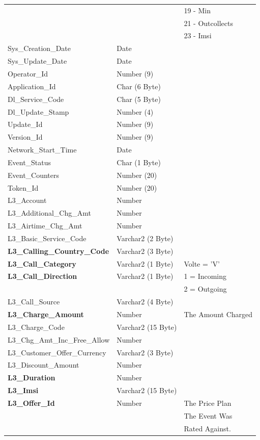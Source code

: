 \documentclass[12pt,twoside]{article}
\begin{document}
\begin{longtable}{l|l|l}
&  & 19 - Min\\
&  & 21 - Outcollects\\
&  & 23 - Imsi\\
Sys\_Creation\_Date & Date & \\
Sys\_Update\_Date & Date & \\
Operator\_Id & Number (9) & \\
Application\_Id & Char (6 Byte) & \\
Dl\_Service\_Code & Char (5 Byte) & \\
Dl\_Update\_Stamp & Number (4) & \\
Update\_Id & Number (9) & \\
Version\_Id & Number (9) & \\
Network\_Start\_Time & Date & \\
Event\_Status & Char (1 Byte) & \\
Event\_Counters & Number (20) & \\
Token\_Id & Number (20) & \\
L3\_Account & Number & \\
L3\_Additional\_Chg\_Amt & Number & \\
L3\_Airtime\_Chg\_Amt & Number & \\
L3\_Basic\_Service\_Code & Varchar2 (2 Byte) & \\
\textbf{L3\_Calling\_Country\_Code} & Varchar2 (3 Byte) & \\
\textbf{L3\_Call\_Category} & Varchar2 (1 Byte) & Volte = 'V'\\
\textbf{L3\_Call\_Direction} & Varchar2 (1 Byte) & 1 = Incoming\\
&  & 2 = Outgoing\\
L3\_Call\_Source & Varchar2 (4 Byte) & \\
\textbf{L3\_Charge\_Amount} & Number & The Amount Charged\\
L3\_Charge\_Code & Varchar2 (15 Byte) & \\
L3\_Chg\_Amt\_Inc\_Free\_Allow & Number & \\
L3\_Customer\_Offer\_Currency & Varchar2 (3 Byte) & \\
L3\_Discount\_Amount & Number & \\
\textbf{L3\_Duration} & Number & \\
\textbf{L3\_Imsi} & Varchar2 (15 Byte) & \\
\textbf{L3\_Offer\_Id} & Number & The Price Plan\\
&  & The Event Was\\
&  & Rated Against.\\

\end{longtable}
\end{document}
